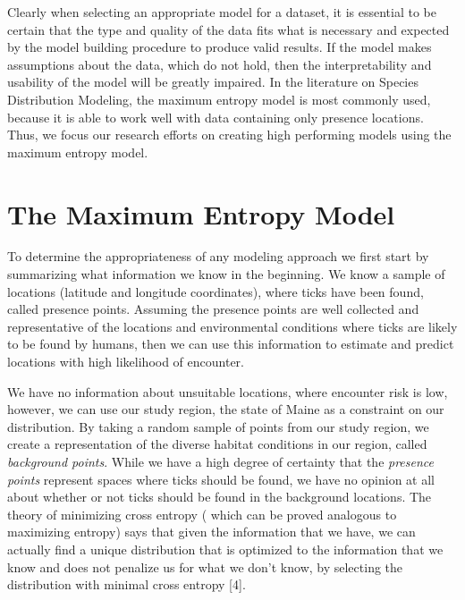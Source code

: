 \noindent Clearly when selecting an appropriate model for a dataset, it is essential to be certain that the type and quality of the data fits what is necessary and expected by the model building procedure to produce valid results. If the model makes assumptions about the data, which do not hold, then the interpretability and usability of the model will be greatly impaired. In the literature on Species Distribution Modeling, the maximum entropy model is most commonly used, because it is able to work well with data containing only presence locations. Thus, we focus our research efforts on creating high performing models using the maximum entropy model. \newline


\section{The Maximum Entropy Model}

To determine the appropriateness of any modeling approach we first start by summarizing what information we know in the beginning. We know a sample of locations (latitude and longitude coordinates), where ticks have been found, called presence points. Assuming the presence points are well collected and representative of the locations and environmental conditions where ticks are likely to be found by humans, then we can use this information to estimate and predict locations with high likelihood of encounter. \newline

\noindent We have no information about unsuitable locations, where encounter risk is low, however, we can use our study region, the state of Maine as a constraint on our distribution. By taking a random sample of points from our study region, we create a representation of the diverse habitat conditions in our region, called \textit{background points}. While we have a high degree of certainty that the \textit{presence points} represent spaces where ticks should be found, we have no opinion at all about whether or not ticks should be found in the background locations. The theory of minimizing cross entropy ( which can be proved analogous to maximizing entropy)  says that given the information that we have, we can actually find a unique distribution that is optimized to the information that we know and does not penalize us for what we don't know, by selecting the distribution with minimal cross entropy [4].\newline


